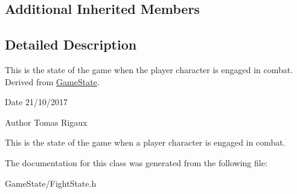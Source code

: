 \subsection*{Additional Inherited Members}


\subsection{Detailed Description}
This is the state of the game when the player character is engaged in combat. Derived from \hyperlink{classGameState}{Game\-State}. 

\begin{DoxyDate}{Date}
21/10/2017 
\end{DoxyDate}
\begin{DoxyAuthor}{Author}
Tomas Rigaux
\end{DoxyAuthor}
This is the state of the game when a player character is engaged in combat. 

The documentation for this class was generated from the following file\-:\begin{DoxyCompactItemize}
\item 
Game\-State/Fight\-State.\-h\end{DoxyCompactItemize}
